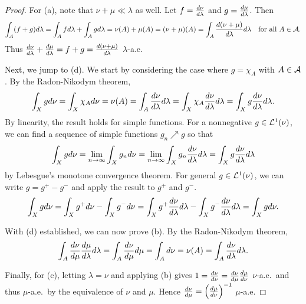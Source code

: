 \begin{proof}
    For (a), note that $\nu+\mu\ll\lambda$ as well. Let 
    $f = \frac{d{\nu}}{d{\lambda}}$ and $g = \frac{d{\mu}}{d{\lambda}}$. 
    Then 
    \begin{equation*}
        \int_A (f+g)d\lambda = \int_A fd\lambda + \int_A gd\lambda 
        = \nu(A) + \mu(A) = (\nu+\mu)(A) 
        = \int_A \frac{d{(\nu+\mu)}}{d{\lambda}}d\lambda
        \quad \text{for all } A\in\mathcal{A}.
    \end{equation*}
    Thus $\frac{d{\nu}}{d{\lambda}} + \frac{d{\mu}}{d{\lambda}} 
    = f+g = \frac{d{(\nu+\mu)}}{d{\lambda}}$ $\lambda$-a.e. 

    Next, we jump to (d). We start by considering the case where $g = \chi_A$ 
    with $A\in\mathcal{A}$. By the Radon-Nikodym theorem, 
    \begin{equation*}
        \int_X gd\nu = \int_X \chi_Ad\nu = \nu(A) = \int_A \frac{d{\nu}}{d{\lambda}}d\lambda 
        = \int_X \chi_A\frac{d{\nu}}{d{\lambda}}d\lambda = \int_X g\frac{d{\nu}}{d{\lambda}}d\lambda.
    \end{equation*}
    By linearity, the result holds for simple functions. For a nonnegative 
    $g\in\mathcal{L}^1(\nu)$, we can find a sequence of simple functions $g_n\nearrow g$ 
    so that 
    \begin{equation*}
        \int_X gd\nu = \lim_{n\to\infty}\int_X g_nd\nu = \lim_{n\to\infty}\int_X g_n\frac{d{\nu}}{d{\lambda}}d\lambda 
        = \int_X g\frac{d{\nu}}{d{\lambda}}d\lambda
    \end{equation*}
    by Lebesgue's monotone convergence theorem. For general $g\in\mathcal{L}^1(\nu)$, 
    we can write $g = g^+ - g^-$ and apply the result to $g^+$ and $g^-$.
    \begin{equation*}
        \int_X gd\nu = \int_X g^+d\nu - \int_X g^-d\nu 
        = \int_X g^+\frac{d{\nu}}{d{\lambda}}d\lambda - \int_X g^-\frac{d{\nu}}{d{\lambda}}d\lambda 
        = \int_X gd\nu.
    \end{equation*} 

    With (d) established, we can now prove (b). By the Radon-Nikodym theorem,
    \begin{equation*}
        \int_A \frac{d{\nu}}{d{\mu}}\frac{d{\mu}}{d{\lambda}}d\lambda 
        = \int_A \frac{d{\nu}}{d{\mu}}d\mu = \int_A d\nu = \nu(A) 
        = \int_A \frac{d{\nu}}{d{\lambda}}d\lambda. 
    \end{equation*} 

    Finally, for (c), letting $\lambda = \nu$ and applying (b) gives 
    $1 = \frac{d{\nu}}{d{\nu}} = \frac{d{\nu}}{d{\mu}}\frac{d{\mu}}{d{\nu}}$ $\nu$-a.e.\ and 
    thus $\mu$-a.e.\ by the equivalence of $\nu$ and $\mu$. Hence 
    $\od{\nu}{\mu} = \pth{\od{\mu}{\nu}}^{-1}$ $\mu$-a.e.
\end{proof}

